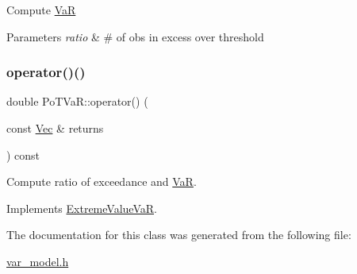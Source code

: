 Compute \hyperlink{classVaR}{VaR} 
\begin{DoxyParams}{Parameters}
{\em ratio} & \# of obs in excess over threshold \\
\hline
\end{DoxyParams}
\hypertarget{classPoTVaR_a3360bbbeceae9bbd0c721e48586bf38c}{}\label{classPoTVaR_a3360bbbeceae9bbd0c721e48586bf38c} 
\subsubsection{\texorpdfstring{operator()()}{operator()()}\hspace{0.1cm}{\footnotesize\ttfamily [2/2]}}
{\footnotesize\ttfamily double Po\+T\+Va\+R\+::operator() (\begin{DoxyParamCaption}\item[{const \hyperlink{compute__returns__eigen_8h_a1eb6a9306ef406d7975f3cbf2e247777}{Vec} \&}]{returns }\end{DoxyParamCaption}) const\hspace{0.3cm}{\ttfamily [virtual]}}



Compute ratio of exceedance and \hyperlink{classVaR}{VaR}. 



Implements \hyperlink{classExtremeValueVaR_a3be021ee0faa2285bcb6be19815e3dc7}{Extreme\+Value\+VaR}.



The documentation for this class was generated from the following file\+:\begin{DoxyCompactItemize}
\item 
\hyperlink{var__model_8h}{var\+\_\+model.\+h}\end{DoxyCompactItemize}
